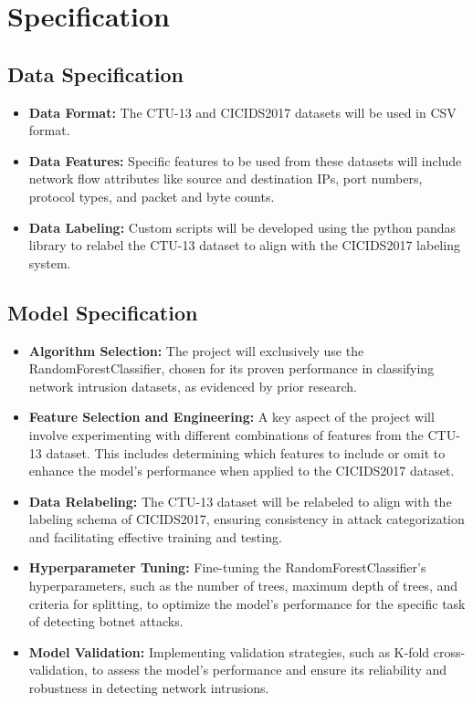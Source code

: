 \chapter{Specification}

\section{Data Specification}
\begin{itemize}
    \item \textbf{Data Format:} The CTU-13 and CICIDS2017 datasets will be used in CSV format.
    \item \textbf{Data Features:} Specific features to be used from these datasets will include network flow attributes like source and destination IPs, port numbers, protocol types, and packet and byte counts.
    \item \textbf{Data Labeling:} Custom scripts will be developed using the python pandas library to relabel the CTU-13 dataset to align with the CICIDS2017 labeling system.
\end{itemize}

\section{Model Specification}
\begin{itemize}
    \item \textbf{Algorithm Selection:} The project will exclusively use the RandomForestClassifier, chosen for its proven performance in classifying network intrusion datasets, as evidenced by prior research.
    \item \textbf{Feature Selection and Engineering:} A key aspect of the project will involve experimenting with different combinations of features from the CTU-13 dataset. This includes determining which features to include or omit to enhance the model's performance when applied to the CICIDS2017 dataset.
    \item \textbf{Data Relabeling:} The CTU-13 dataset will be relabeled to align with the labeling schema of CICIDS2017, ensuring consistency in attack categorization and facilitating effective training and testing.
    \item \textbf{Hyperparameter Tuning:} Fine-tuning the RandomForestClassifier's hyperparameters, such as the number of trees, maximum depth of trees, and criteria for splitting, to optimize the model's performance for the specific task of detecting botnet attacks.
    \item \textbf{Model Validation:} Implementing validation strategies, such as K-fold cross-validation, to assess the model's performance and ensure its reliability and robustness in detecting network intrusions.
\end{itemize}

